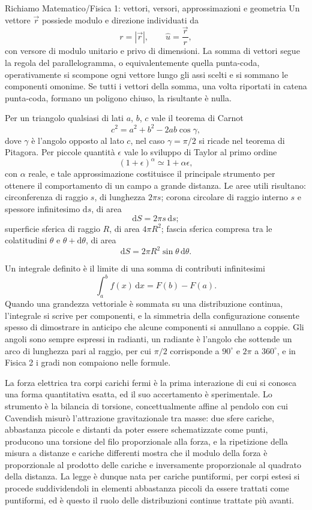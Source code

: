\documentclass[11pt,a4paper]{article}
\newcommand{\dd}{\mathrm{d}}
\newcommand{\uv}{\hat{u}}
\begin{document}
\begin{richiamo}{Richiamo Matematico/Fisica 1: vettori, versori, approssimazioni e geometria}
Un vettore $\vec r$ possiede modulo e direzione individuati da
\[
r=|\vec r|, \qquad \uv=\frac{\vec r}{r},
\]
con versore di modulo unitario e privo di dimensioni. La somma di vettori segue la regola del parallelogramma, o equivalentemente quella punta-coda, operativamente si scompone ogni vettore lungo gli assi scelti e si sommano le componenti omonime. Se tutti i vettori della somma, una volta riportati in catena punta-coda, formano un poligono chiuso, la risultante è nulla.

Per un triangolo qualsiasi di lati $a$, $b$, $c$ vale il teorema di Carnot
\[
c^2=a^2+b^2-2ab\cos\gamma,
\]
dove $\gamma$ è l'angolo opposto al lato $c$, nel caso $\gamma=\pi/2$ si ricade nel teorema di Pitagora. Per piccole quantità $\epsilon$ vale lo sviluppo di Taylor al primo ordine
\[
(1+\epsilon)^{\alpha}\simeq 1+\alpha\epsilon,
\]
con $\alpha$ reale, e tale approssimazione costituisce il principale strumento per ottenere il comportamento di un campo a grande distanza. Le aree utili risultano: circonferenza di raggio $s$, di lunghezza $2\pi s$; corona circolare di raggio interno $s$ e spessore infinitesimo $\dd s$, di area
\[
\dd S=2\pi s\,\dd s;
\]
superficie sferica di raggio $R$, di area $4\pi R^2$; fascia sferica compresa tra le colatitudini $\theta$ e $\theta+\dd\theta$, di area
\[
\dd S=2\pi R^2\sin\theta\,\dd\theta.
\]

Un integrale definito è il limite di una somma di contributi infinitesimi
\[
\int_a^b f(x)\,\dd x = F(b)-F(a).
\]
Quando una grandezza vettoriale è sommata su una distribuzione continua, l'integrale si scrive per componenti, e la simmetria della configurazione consente spesso di dimostrare in anticipo che alcune componenti si annullano a coppie. Gli angoli sono sempre espressi in radianti, un radiante è l'angolo che sottende un arco di lunghezza pari al raggio, per cui $\pi/2$ corrisponde a $90^{\circ}$ e $2\pi$ a $360^{\circ}$, e in Fisica 2 i gradi non compaiono nelle formule.
\end{richiamo}

La forza elettrica tra corpi carichi fermi è la prima interazione di cui si conosca una forma quantitativa esatta, ed il suo accertamento è sperimentale. Lo strumento è la bilancia di torsione, concettualmente affine al pendolo con cui Cavendish misurò l'attrazione gravitazionale tra masse: due sfere cariche, abbastanza piccole e distanti da poter essere schematizzate come punti, producono una torsione del filo proporzionale alla forza, e la ripetizione della misura a distanze e cariche differenti mostra che il modulo della forza è proporzionale al prodotto delle cariche e inversamente proporzionale al quadrato della distanza. La legge è dunque nata per cariche puntiformi, per corpi estesi si procede suddividendoli in elementi abbastanza piccoli da essere trattati come puntiformi, ed è questo il ruolo delle distribuzioni continue trattate più avanti.
\end{document}

